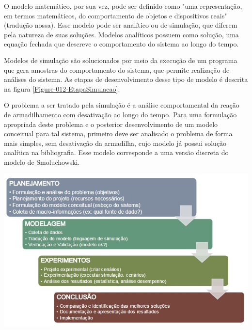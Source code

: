 O modelo matemático, por sua vez, pode ser definido como "uma representação, em
termos matemáticos, do comportamento de objetos e dispositivos reais"\cite{2}
(tradução nossa). Esse modelo pode ser analítico ou de simulação, que diferem
pela natureza de suas soluções. Modelos analíticos possuem como solução, uma
equação fechada que descreve o comportamento do sistema ao longo do
tempo\cite{1}.

Modelos de simulação são solucionados por meio da execução de um programa que
gera amostras do comportamento do sistema, que permite realização de análises
do sistema\cite{1}. As etapas de desenvolvimento desse tipo de modelo é
descrita na figura \ref{Figure-012-EtapaSimulacao}.

O problema a ser tratado pela simulação é a análise comportamental da reação de
armadilhamento com desativação ao longo do tempo. Para uma formulação apropriada
deste problema e o posterior desenvolvimento de um modelo conceitual para tal
sistema, primeiro deve ser analisado o problema de forma mais simples, sem
desativação da armadilha, cujo modelo já possui solução analítica na
bibliografia. Esse modelo corresponde a uma versão discreta do modelo de
Smoluchowski\cite{5}.

{ \centering
	\hfill \break
	\captionsetup{type=figure}
	\includegraphics[width=\columnwidth]{./figures/012-EtapaSimulacao.jpg}
	\label{Figure-012-EtapaSimulacao}
}
